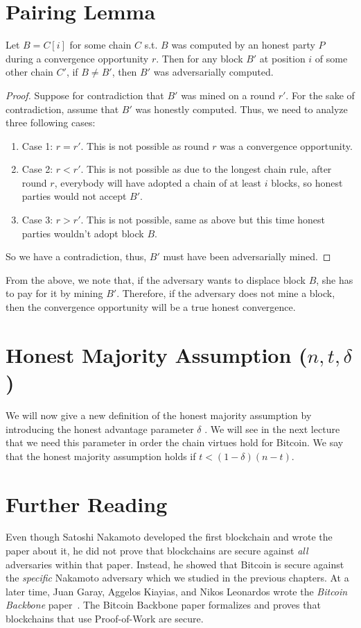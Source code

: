 \section{Pairing Lemma}
\begin{lemma}
Let $B = C[i]$ for some chain $C$ s.t. $B$ was computed by an honest party $P$ during a convergence opportunity $r$. Then for any block $B'$ at position $i$ of some other chain $C'$, if $B \neq B'$, then $B'$ was adversarially computed.
\end{lemma}
\begin{proof}
Suppose for contradiction that $B'$ was mined on a round $r'$. For the sake of contradiction, assume that $B'$ was honestly computed. Thus, we need to analyze three following cases:
\begin{enumerate}
    \item Case 1: $r = r'$. This is not possible as round $r$ was a convergence opportunity.
    \item Case 2: $r < r'$. This is not possible as due to the longest chain rule, after round $r$, everybody will have adopted a chain of at least $i$ blocks, so honest parties would not accept $B'$.
    \item Case 3: $r > r'$. This is not possible, same as above but this time honest parties wouldn't adopt block $B$.
\end{enumerate}
So we have a contradiction, thus, $B'$ must have been adversarially mined.
\end{proof}

From the above, we note that,
if the adversary wants to displace block $B$, she has to pay for it by mining $B'$. Therefore, if the adversary does not mine a block, then the convergence opportunity will be a true honest convergence.

\section{Honest Majority Assumption (\texorpdfstring{$n, t, \delta$}{Lg})}
We will now give a new definition of the honest majority assumption by introducing the honest advantage parameter $\delta$ . We will see in the next lecture that we need this parameter in order the chain virtues hold for Bitcoin. We say that the honest majority assumption holds if $t < (1 - \delta)(n - t)$.

\section{Further Reading}
Even though Satoshi Nakamoto developed the first blockchain and wrote the paper about it, he did
not prove that blockchains are secure against \emph{all} adversaries within that paper. Instead,
he showed that Bitcoin is secure against the \emph{specific} Nakamoto adversary which we studied
in the previous chapters. At a later time, Juan Garay, Aggelos Kiayias, and Nikos Leonardos
wrote the \emph{Bitcoin Backbone} paper~\cite{backbone}.
The Bitcoin Backbone paper formalizes and proves that blockchains that use Proof-of-Work
are secure.